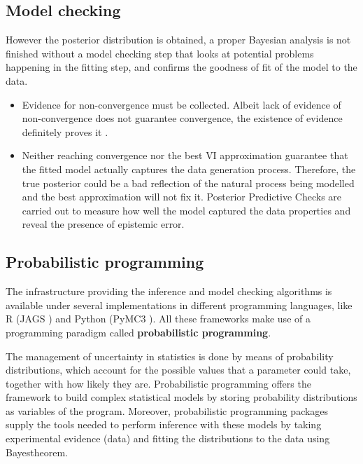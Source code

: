 \subsection{Model checking}
\label{subsec:model_checking}

However the posterior distribution is obtained, a proper Bayesian analysis is not finished without a model checking step that looks at potential problems happening in the fitting step, and confirms the goodness of fit of the model to the data.

\begin{itemize}

\item Evidence for non-convergence must be collected. Albeit lack of evidence of non-convergence does not guarantee convergence, the existence of evidence definitely proves it \cite{Kruschke}.

\item Neither reaching convergence nor the best \ac{VI} approximation guarantee that the fitted model actually captures the data generation process. Therefore, the true posterior could be a bad reflection of the natural process being modelled and the best approximation will not fix it. Posterior Predictive Checks are carried out to measure how well the model captured the data properties \cite{Kruschke} and reveal the presence of epistemic error.

\end{itemize}




\subsection{Probabilistic programming}

The infrastructure providing the inference and model checking algorithms is available under several implementations in different programming languages, like R (JAGS \cite{Plummer}) and Python (PyMC3 \cite{Salvatier2016}). All these frameworks make use of a programming paradigm called \textbf{probabilistic programming}.


The management of uncertainty in statistics is done by means of probability distributions, which account for the possible values that a parameter could take, together with how likely they are. Probabilistic programming offers the framework to build complex statistical models by storing probability distributions as variables of the program. Moreover, probabilistic programming packages supply the tools needed to perform inference with these models by taking experimental evidence (data) and fitting the distributions to the data using Bayes\textquotesingle theorem.

